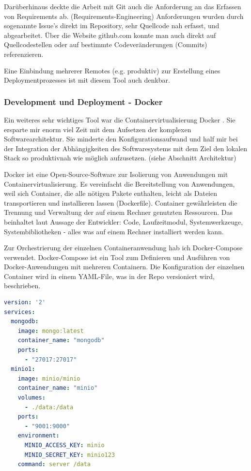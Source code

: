 \documentclass[12pt]{article}
\begin{document}
Darüberhinaus deckte die Arbeit mit Git auch die Anforderung an das Erfassen von Requirements ab. (Requirements-Engineering) Anforderungen wurden durch sogenannte Issue's direkt im Repository, sehr Quellcode nah erfasst, und abgearbeitet. Über die Website github.com konnte man auch direkt auf Quellcodestellen oder auf bestimmte Codeveränderungen (Commits) referenzieren.

Eine Einbindung mehrerer Remotes (e.g. produktiv) zur Erstellung eines Deploymentprozesses ist mit diesem Tool auch denkbar.




\subsubsection{Development und Deployment - Docker}

Ein weiteres sehr wichtiges Tool war die Containervirtualisierung Docker \cite{DOCKER}. Sie ersparte mir enorm viel Zeit mit dem Aufsetzen der komplexen Softwarearchitektur. Sie minderte den Konfigurationsaufwand und half mir bei der Integration der Abhängigkeiten des Softwaresystems mit dem Ziel den lokalen Stack so produktivnah wie möglich aufzusetzen. (siehe Abschnitt Architektur)

Docker ist eine Open-Source-Software zur Isolierung von Anwendungen mit Containervirtualisierung. Es vereinfacht die Bereitstellung von Anwendungen, weil sich Container, die alle nötigen Pakete enthalten, leicht als Dateien transportieren und installieren lassen (Dockerfile). Container gewährleisten die Trennung und Verwaltung der auf einem Rechner genutzten Ressourcen. Das beinhaltet laut Aussage der Entwickler: Code, Laufzeitmodul, Systemwerkzeuge, Systembibliotheken - alles was auf einem Rechner installiert werden kann.

Zur Orchestrierung der einzelnen Containeranwendung hab ich Docker-Compose verwendet. Docker-Compose ist ein Tool zum Definieren und Ausführen von Docker-Anwendungen mit mehreren Containern. Die Konfiguration der einzelnen Container wird in einem YAML-File, was in der Repo versioniert wird, beschrieben.

\bigbreak


\lstset{basicstyle=\ttfamily}
\lstset{xleftmargin=.2\textwidth, xrightmargin=.2\textwidth}
\begin{lstlisting}[language=yaml,frame=single]
version: '2'
services:
  mongodb:
    image: mongo:latest
    container_name: "mongodb"
    ports:
      - "27017:27017"
  minio1:
    image: minio/minio
    container_name: "minio"
    volumes:
      - ./data:/data
    ports:
      - "9001:9000"
    environment:
      MINIO_ACCESS_KEY: minio
      MINIO_SECRET_KEY: minio123
    command: server /data
\end{lstlisting}
\end{document}
